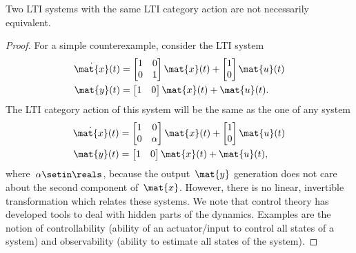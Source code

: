 \begin{remark}
    Two LTI systems with the same LTI category action are not necessarily equivalent.
\end{remark}


\begin{proof}
    For a simple counterexample, consider the LTI system
    \begin{equation}
        \begin{aligned}
            \dot{\mat{x}}(t) & =\begin{bmatrix}
                                    1 & 0 \\ 0& 1
                                \end{bmatrix} \mat{x}(t)+\begin{bmatrix}
                                                             1 \\ 0
                                                         \end{bmatrix} \mat{u}(t) \\
            \mat{y}(t)       & =\begin{bmatrix}
                                    1 & 0
                                \end{bmatrix} \mat{x}(t)+\mat{u}(t).
        \end{aligned}
    \end{equation}
    The LTI category action of this system will be the same as the one of any system
    \begin{equation}
        \begin{aligned}
            \dot{\mat{x}}(t) & =\begin{bmatrix}
                                    1 & 0 \\ 0& \alpha
                                \end{bmatrix} \mat{x}(t)+\begin{bmatrix}
                                                             1 \\ 0
                                                         \end{bmatrix} \mat{u}(t) \\
            \mat{y}(t)       & =\begin{bmatrix}
                                    1 & 0
                                \end{bmatrix} \mat{x}(t)+\mat{u}(t),
        \end{aligned}
    \end{equation}
    where~$\alpha \setin \reals$, because the output~$\mat{y}$ generation does not care about the second component of~$\mat{x}$.
    However, there is no linear, invertible transformation which relates these systems.
    We note that control theory has developed tools to deal with hidden parts of the dynamics.
    Examples are the notion of controllability (ability of an actuator/input to control all states of a system) and observability (ability to estimate all states of the system).
\end{proof}

